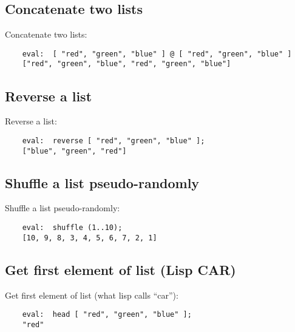\cutend*

\subsection{Concatenate two lists}

Concatenate two lists:
\begin{verbatim}
    eval:  [ "red", "green", "blue" ] @ [ "red", "green", "blue" ]
    ["red", "green", "blue", "red", "green", "blue"]
\end{verbatim}

\cutend*

\subsection{Reverse a list}

Reverse a list:
\begin{verbatim}
    eval:  reverse [ "red", "green", "blue" ];
    ["blue", "green", "red"]
\end{verbatim}

\cutend*

\subsection{Shuffle a list pseudo-randomly}

Shuffle a list pseudo-randomly:
\begin{verbatim}
    eval:  shuffle (1..10);
    [10, 9, 8, 3, 4, 5, 6, 7, 2, 1]
\end{verbatim}

\cutend*

\subsection{Get first element of list (Lisp {\sc CAR})}

Get first element of list (what lisp calls ``car''):
\begin{verbatim}
    eval:  head [ "red", "green", "blue" ];
    "red"
\end{verbatim}

